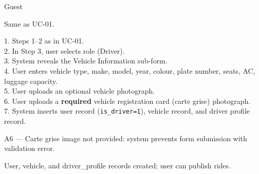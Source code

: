 \documentclass[12pt,a4paper,openright]{report}
\newenvironment{ucbox}[1]{%
  \begin{tcolorbox}[title=#1, colback=fdnavy!3, colframe=fdnavy,
    fonttitle=\bfseries, breakable]%
}{%
  \end{tcolorbox}%
}
\begin{document}
\vspace{0.5cm}

\begin{ucbox}{UC-02: Register as Driver}
\begin{description}[noitemsep, font=\bfseries, leftmargin=3.5cm]
\item[Actor:] Guest
\item[Pre-condition:] Same as UC-01.
\item[Main Flow:]
    1. Steps 1–2 as in UC-01.\\
    2. In Step 3, user selects role (Driver).\\
    3. System reveals the Vehicle Information sub-form.\\
    4. User enters vehicle type, make, model, year, colour, plate number, seats, AC, luggage capacity.\\
    5. User uploads an optional vehicle photograph.\\
    6. User uploads a \textbf{required} vehicle registration card (carte grise) photograph.\\
    7. System inserts user record (\texttt{is\_driver=1}), vehicle record, and driver profile record.
\item[Alternative Flow:] A6 — Carte grise image not provided: system prevents form submission with validation error.
\item[Post-condition:] User, vehicle, and driver\_profile records created; user can publish rides.
\end{description}
\end{ucbox}

\vspace{0.5cm}
\end{document}
